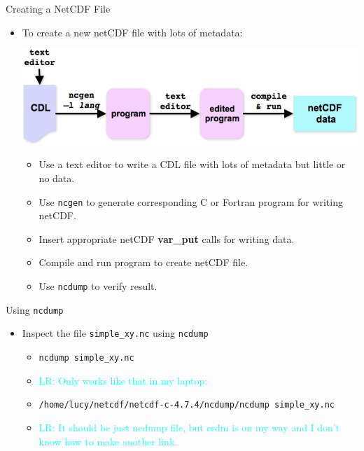 \documentclass[compress,11pt,xcolor=svgnames,aspectratio=169]{beamer}
\newcommand{\lr}[1]{\textcolor{cyan}{LR: #1}}
\begin{document}
\begin{frame}[fragile]{Creating a NetCDF File}

\begin{itemize}
  \item To create a new netCDF file with lots of metadata:\\[0.3cm]

\begin{center}
\includegraphics[scale=0.5]{fig/nc-creat}
\end{center}

    \begin{itemize}
    \setlength\itemsep{0.1cm}
      \item Use a text editor to write a CDL file with lots of metadata but little or no data.
      \item Use \texttt{ncgen} to generate corresponding C or Fortran program for writing netCDF.
      \item Insert appropriate netCDF \textbf{var\_put} calls for writing data.
      \item Compile and run program to create netCDF file.
      \item Use \texttt{ncdump} to verify result.
    \end{itemize}

\end{itemize}

\end{frame}

\begin{frame}[fragile]{Using \texttt{ncdump}}

\begin{itemize}

  \item Inspect the file \verb|simple_xy.nc| using \verb|ncdump|\\[0.4cm]

  \begin{itemize}
  \setlength\itemsep{0.5cm}

    \item \verb|ncdump simple_xy.nc|

    \item \lr{Only works like that in my laptop:}

    \item \verb|/home/lucy/netcdf/netcdf-c-4.7.4/ncdump/ncdump simple_xy.nc|

    \item \lr{It should be just ncdump file, but esdm is on my way and I don’t know how to make another link.}

  \end{itemize}

\end{itemize}

\end{frame}
\end{document}
